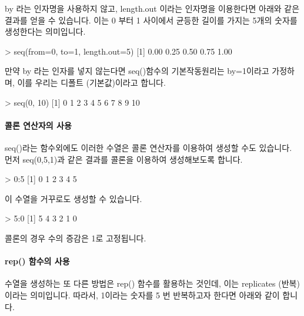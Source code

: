 \documentclass[tutorial.tex]{subfiles}
\begin{document}
by 라는 인자명을 사용하지 않고, length.out 이라는 인자명을 이용한다면 아래와 같은 결과를 얻을 수 있습니다. 
이는 0 부터 1 사이에서 균등한 길이를 가지는 5개의 숫자를 생성한다는 의미입니다. 

\begin{Schunk}
\begin{Soutput}
> seq(from=0, to=1, length.out=5)
[1] 0.00 0.25 0.50 0.75 1.00
\end{Soutput}
\end{Schunk}


만약 by 라는 인자를 넣지 않는다면 seq()함수의 기본작동원리는 by=1이라고 가정하며, 이를 우리는 디폴트 (기본값)이라고 합니다. 

\begin{Schunk}
\begin{Soutput}
> seq(0, 10)
 [1]  0  1  2  3  4  5  6  7  8  9 10	
\end{Soutput}
\end{Schunk}

\paragraph{콜론 연산자의 사용} 

seq()라는 함수외에도 이러한 수열은 콜론 연산자를 이용하여 생성할 수도 있습니다. 
먼저 seq(0,5,1)과 같은 결과를 콜론을 이용하여  생성해보도록 합니다. 

\begin{Schunk}
\begin{Soutput}
> 0:5
[1] 0 1 2 3 4 5
\end{Soutput}
\end{Schunk}

이 수열을 거꾸로도 생성할 수 있습니다. 

\begin{Schunk}
\begin{Soutput}
> 5:0
[1] 5 4 3 2 1 0	
\end{Soutput}
\end{Schunk}

콜론의 경우 수의 증감은 1로 고정됩니다.

\paragraph{rep() 함수의 사용} 

수열을 생성하는 또 다른 방법은 rep() 함수를 활용하는 것인데, 이는 replicates (반복)이라는 의미입니다.
따라서, 1이라는 숫자를 5 번 반복하고자 한다면 아래와 같이 합니다. 
\end{document}
